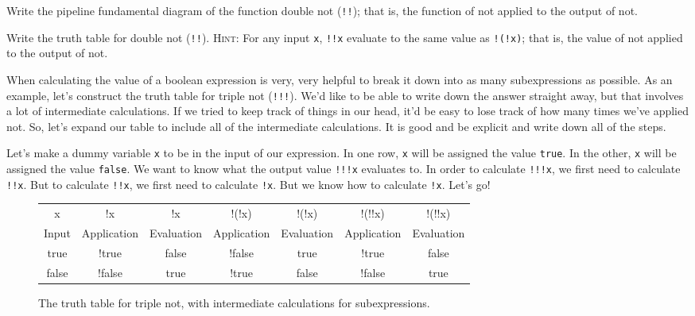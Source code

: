 \begin{question}
  Write the pipeline fundamental diagram of the function double \textsf{not} (\texttt{!!}); that is, the function of \textsf{not} applied to the output of \textsf{not}.
\end{question}

\begin{question}
  Write the truth table for double \textsf{not} (\texttt{!!}). \textsc{Hint:} For any input \texttt{x}, \texttt{!!x} evaluate to the same value as \texttt{!(!x)}; that is, the value of \textsf{not} applied to the output of \textsf{not}.
\end{question}

When calculating the value of a boolean expression is very, very helpful to break it down into as many subexpressions as possible. As an example, let's construct the truth table for triple \textsf{not} (\texttt{!!!}). We'd like to be able to write down the answer straight away, but that involves a lot of intermediate calculations. If we tried to keep track of things in our head, it'd be easy to lose track of how many times we've applied \textsf{not}. So, let's expand our table to include all of the intermediate calculations.  It is good and be explicit and write down all of the steps.

Let's make a dummy variable \texttt{x} to be in the input of our expression. In one row, \texttt{x} will be assigned the value \texttt{true}. In the other, \texttt{x} will be assigned the value \texttt{false}. We want to know what the output value \texttt{!!!x} evaluates to. In order to calculate \texttt{!!!x}, we first need to calculate \texttt{!!x}. But to calculate \texttt{!!x}, we first need to calculate \texttt{!x}. But we know how to calculate \texttt{!x}. Let's go!

\begin{figure*}[h]
  \ttfamily
  \color{cyan}
  \small
  \begin{tabular}{c c c c c c c}
    x & !x & !x & !(!x) & !(!x) & !(!!x) & !(!!x) \\
    \textsf{Input} & \textsf{Application} & \textsf{Evaluation} & \textsf{Application} & \textsf{Evaluation} & \textsf{Application} & \textsf{Evaluation}\\
    \hline
    true & !true & false & !false & true & !true & false\\
    false & !false & true & !true & false & !false & true
  \end{tabular}
  \caption{\label{fig:conditional-triple-not-table}The truth table for triple \textsf{not}, with intermediate calculations for subexpressions.}
\end{figure*}

